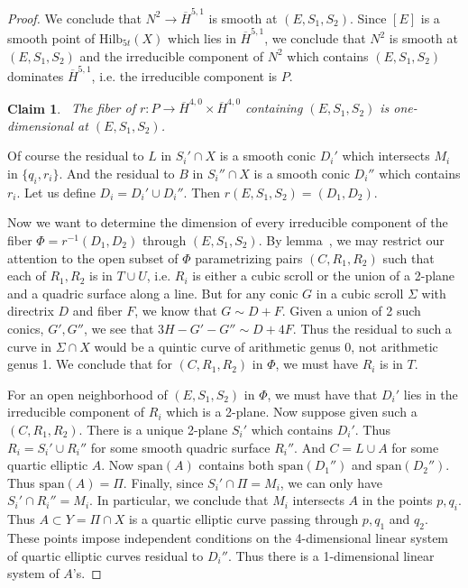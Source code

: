 \documentclass[amssymb,twoside,12 pt,amscd,reqno]{amsart}
\theoremstyle{plain}
\newtheorem{Claim}[thm]{Claim}
\theoremstyle{definition}
\def\ps{\vspace{4pt}}
\begin{document}
\begin{proof}
\ps

We conclude that $N^2\rightarrow \overline{H}^{5,1}$ is
smooth at $(E,S_1,S_2)$.  Since $[E]$ is a smooth point of
$\text{Hilb}_{5t}(X)$ which lies in $\overline{H}^{5,1}$, we conclude
that $N^2$ is smooth at $(E,S_1,S_2)$ and the irreducible
component of $N^2$ which contains $(E,S_1,S_2)$ dominates
$\overline{H}^{5,1}$, i.e. the irreducible component is $P$.  

\ps

\begin{Claim}~\label{claim-a3}
The fiber of $r:P\rightarrow
\overline{H}^{4,0}\times \overline{H}^{4,0}$ containing $(E,S_1,S_2)$
is one-dimensional at $(E,S_1,S_2)$.
\end{Claim}
 
Of course the residual to $L$ in
$S_i'\cap X$ is a smooth conic $D_i'$ which intersects $M_i$ in
$\{q_i,r_i\}$.  And 
the residual to $B$ in $S_i''\cap X$ is a smooth conic $D_i''$ which
contains $r_i$.  Let us define $D_i=D_i'\cup D_i''$.  Then
$r(E,S_1,S_2) = 
(D_1,D_2)$.  

\ps

Now we want to determine the dimension of every irreducible component
of the fiber $\Phi=r^{-1}(D_1,D_2)$ through $(E,S_1,S_2)$.  By
lemma~\cite[lemma 6.3]{HRS1}, we may restrict our attention to the open
subset of $\Phi$ parametrizing pairs $(C,R_1,R_2)$ such that each of
$R_1,R_2$ is in $T\cup U$, i.e. $R_i$ is either a cubic scroll or
the union of a 2-plane and a quadric surface along a line.  
But for any conic $G$ in a cubic scroll $\Sigma$ with directrix
$D$ and fiber $F$, we know that $G\sim D+F$.  Given a union of 2 such
conics, $G',G''$, we see that $3H-G'-G'' \sim D+4F$.  Thus the
residual to such a curve in $\Sigma\cap X$ would be a quintic curve of
arithmetic genus 0, not arithmetic genus 1.  We conclude that for
$(C,R_1,R_2)$ in $\Phi$, we must have $R_i$ is in $T$.  

\ps

For
an open neighborhood of $(E,S_1,S_2)$ in $\Phi$, we must have that
$D_i'$ lies in the irreducible component of $R_i$ which is a 2-plane.
Now suppose given such a $(C,R_1,R_2)$.  There is a unique 2-plane
$S_i'$ which contains $D_i'$.  Thus $R_i = S_i'\cup R_i''$ for some
smooth quadric 
surface $R_i''$.  And $C=L\cup A$ for some quartic elliptic $A$.  Now
$\text{span}(A) $ contains both $\text{span}(D_1'')$ and
$\text{span}(D_2'')$.  Thus $\text{span}(A)=\Pi$.  Finally, since
$S_i'\cap \Pi = M_i$, we can only have $S_i'\cap R_i'' = M_i$.  In
particular, we conclude that $M_i$ intersects $A$ in the points
$p,q_i$.  Thus $A\subset Y=\Pi\cap X$ is a quartic elliptic curve
passing through $p,q_1$ and $q_2$.  These points impose independent
conditions on the 4-dimensional linear system of quartic elliptic
curves residual to $D_i''$.  Thus there is a 1-dimensional linear
system of $A$'s.  


\end{proof}
\end{document}
